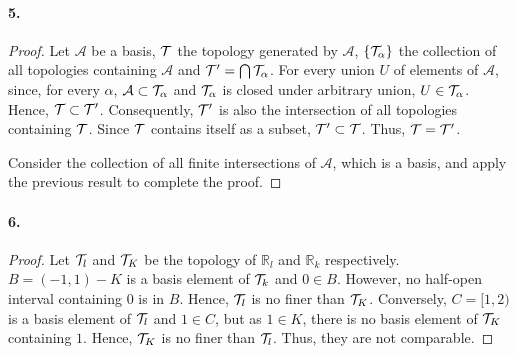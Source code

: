   \paragraph{5.}
  \begin{proof}
    Let $\mathcal{A}$ be a basis, $\mathcal{T}$ the topology generated by 
    $\mathcal{A}$, $\{\mathcal{T}_\alpha\}$ the collection of all topologies containing
    $\mathcal{A}$ and $\mathcal{T}^\prime=\bigcap\mathcal{T}_\alpha$. For every union $U$ of
    elements of $\mathcal{A}$, since, for every $\alpha$, $\mathcal{A}\subset
    \mathcal{T}_\alpha$ and $\mathcal{T}_\alpha$ is closed under arbitrary union, $U\in
    \mathcal{T}_\alpha$. Hence, $\mathcal{T}\subset\mathcal{T}^\prime$. Consequently, $\mathcal{T}^\prime$ is also the
    intersection of all topologies containing $\mathcal{T}$. Since $\mathcal{T}$ contains 
    itself as a subset, $\mathcal{T}^\prime\subset\mathcal{T}$. Thus, $\mathcal{T}=\mathcal{T}^\prime$.\par
    Consider the collection of all finite intersections of $\mathcal{A}$, which
    is a basis, and apply the previous result to complete the proof.
  \end{proof}
  
  \paragraph{6.}
  \begin{proof}
    Let $\mathcal{T}_l$ and $\mathcal{T}_K$ be the topology of $\mathbb{R}_l$ and $\mathbb{R}
    _k$ respectively. $B=(-1,1)-K$ is a basis element of $\mathcal{T}_k$ and $0\in B$.
    However, no half-open interval containing $0$ is in $B$. Hence, $\mathcal{T}_l$ is
    no finer than $\mathcal{T}_K$. Conversely, $C=[1,2)$ is a basis element of $\mathcal{T}_l$ 
    and $1\in C$, but as $1\in K$, there is no basis element of $\mathcal{T}_K$ 
    containing $1$. Hence, $\mathcal{T}_K$ is no finer than $\mathcal{T}_l$. Thus, they are not
    comparable.
  \end{proof}
  
